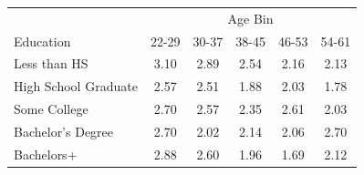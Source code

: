 \begin{tabular}{lccccc}
\hline\hline
 & \multicolumn{5}{c}{Age Bin} \\
Education & 22-29 & 30-37 & 38-45 & 46-53 & 54-61 \\
\hline
Less than HS&3.10&2.89&2.54&2.16&2.13\\
High School Graduate&2.57&2.51&1.88&2.03&1.78\\
Some College&2.70&2.57&2.35&2.61&2.03\\
Bachelor's Degree&2.70&2.02&2.14&2.06&2.70\\
Bachelors+&2.88&2.60&1.96&1.69&2.12\\
\hline\hline
\end{tabular}
